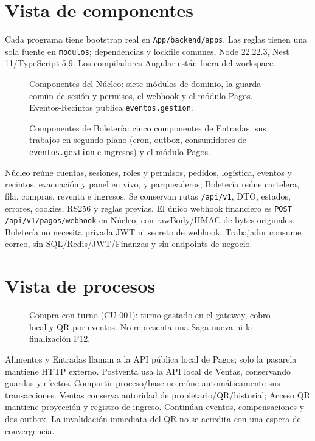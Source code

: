 \section{Vista de componentes}
\label{sec:componentes}
Cada programa tiene bootstrap real en \texttt{App/backend/apps}. Las reglas tienen
una sola fuente en \texttt{modulos}; dependencias y lockfile comunes, Node 22.22.3,
Nest 11/TypeScript 5.9. Los compiladores Angular están fuera del workspace.
\begin{figure}[H]\centering\HexComponentesNucleo
\caption{Componentes del Núcleo: siete módulos de dominio, la guarda común de sesión y permisos, el
webhook y el módulo Pagos. Eventos-Recintos publica \texttt{eventos.gestion}.}
\label{fig:componentes}\end{figure}
\begin{figure}[H]\centering\HexComponentesBoleteria
\caption{Componentes de Boletería: cinco componentes de Entradas, sus trabajos en segundo plano
(cron, outbox, consumidores de \texttt{eventos.gestion} e ingresos) y el módulo Pagos.}
\label{fig:componentes-boleteria}\end{figure}
Núcleo reúne cuentas, sesiones, roles y permisos, pedidos, logística, eventos y
recintos, evacuación y panel en vivo, y parqueaderos; Boletería reúne
cartelera, fila, compras, reventa e ingresos. Se conservan rutas \texttt{/api/v1}, DTO,
estados, errores, cookies, RS256 y reglas previas. El único webhook financiero es
\texttt{POST /api/v1/pagos/webhook} en Núcleo, con rawBody/HMAC de bytes originales.
Boletería no necesita privada JWT ni secreto de webhook. Trabajador consume correo,
sin SQL/Redis/JWT/Finanzas y sin endpoints de negocio.

\section{Vista de procesos}
\label{sec:procesos}
\begin{figure}[H]\centering\HexSecuencia
\caption{Compra con turno (CU-001): turno gastado en el gateway, cobro local y QR por eventos. No
representa una Saga nueva ni la finalización F12.}
\label{fig:secuencia}\end{figure}
Alimentos y Entradas llaman a la API pública local de Pagos; solo la pasarela
mantiene HTTP externo. Postventa usa la API local de Ventas, conservando guardas y
efectos. Compartir proceso/base no reúne automáticamente sus transacciones.
Ventas conserva autoridad de propietario/QR/historial; Acceso QR mantiene proyección
y registro de ingreso. Continúan eventos, compensaciones y dos outbox. La invalidación
inmediata del QR no se acredita con una espera de convergencia.


